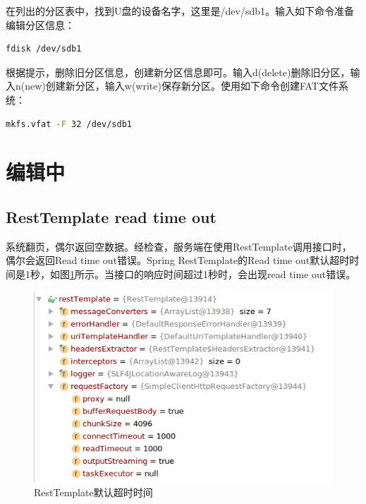 \documentclass{book}
\begin{document}
在列出的分区表中，找到U盘的设备名字，这里是/dev/sdb1。输入如下命令准备编辑分区信息：

\begin{lstlisting}[language=Bash]
fdisk /dev/sdb1
\end{lstlisting}

根据提示，删除旧分区信息，创建新分区信息即可。输入d(delete)删除旧分区，输入n(new)创建新分区，输入w(write)保存新分区。使用如下命令创建FAT文件系统：

\begin{lstlisting}[language=Bash]
mkfs.vfat -F 32 /dev/sdb1
\end{lstlisting}



\section{编辑中}

\subsection{RestTemplate read time out}

系统翻页，偶尔返回空数据。经检查，服务端在使用RestTemplate调用接口时，偶尔会返回Read time out错误。Spring RestTemplate的Read time out默认超时时间是1秒，如图\ref{fig:resttempldatedefaulttimeout}所示。当接口的响应时间超过1秒时，会出现read time out错误。

\begin{figure}[htbp]
	\centering
	\includegraphics[scale=0.6]{resttempldatedefaulttimeout.png}
	\caption{RestTemplate默认超时时间}
	\label{fig:resttempldatedefaulttimeout}
\end{figure}
\end{document}
